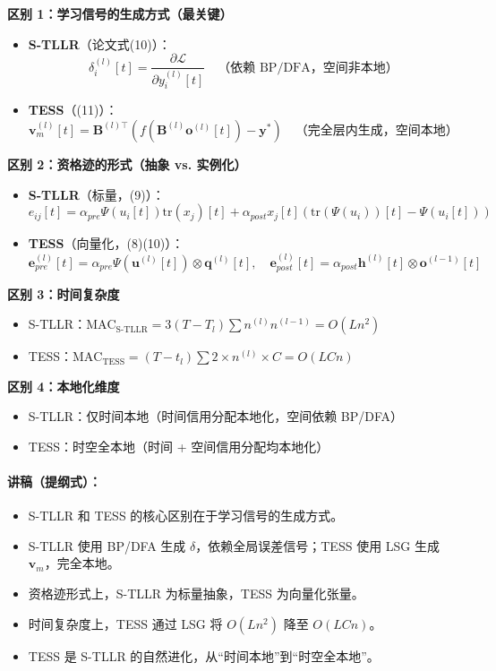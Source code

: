 \documentclass[journal,12pt,onecolumn]{IEEEtran}
\begin{document}
\textbf{区别 1：学习信号的生成方式（最关键）}
\begin{itemize}
    \item \textbf{S-TLLR}（论文式(10)）：
    \[
    \delta_i^{(l)}[t] = \frac{\partial \mathcal{L}}{\partial y_i^{(l)}[t]} \quad \text{（依赖 BP/DFA，空间非本地）}
    \]
    \item \textbf{TESS}（\cite{apolinario_tess_2025}(11)）：
    \[
    \mathbf{v}_m^{(l)}[t] = \mathbf{B}^{(l)\top} \left( f(\mathbf{B}^{(l)} \mathbf{o}^{(l)}[t]) - \mathbf{y}^* \right) \quad \text{（完全层内生成，空间本地）}
    \]
\end{itemize}

\textbf{区别 2：资格迹的形式（抽象 vs. 实例化）}
\begin{itemize}
    \item \textbf{S-TLLR}（标量，\cite{apolinario_s-tllr_2024}(9)）：
    \[
    e_{ij}[t] = \alpha_{pre}\Psi(u_i[t])\text{tr}(x_j)[t] + \alpha_{post}x_j[t](\text{tr}(\Psi(u_i))[t] - \Psi(u_i[t]))
    \]
    \item \textbf{TESS}（向量化，\cite{apolinario_tess_2025}(8)(10)）：
    \[
    \mathbf{e}_{pre}^{(l)}[t] = \alpha_{pre}\Psi(\mathbf{u}^{(l)}[t]) \otimes \mathbf{q}^{(l)}[t], \quad
    \mathbf{e}_{post}^{(l)}[t] = \alpha_{post}\mathbf{h}^{(l)}[t] \otimes \mathbf{o}^{(l-1)}[t]
    \]
\end{itemize}

\textbf{区别 3：时间复杂度}
\begin{itemize}
    \item S-TLLR：\(\text{MAC}_{\text{S-TLLR}} = 3(T-T_l) \sum n^{(l)} n^{(l-1)} = O(Ln^2)\)
    \item TESS：\(\text{MAC}_{\text{TESS}} = (T-t_l) \sum 2 \times n^{(l)} \times C = O(LCn)\)
\end{itemize}

\textbf{区别 4：本地化维度}
\begin{itemize}
    \item S-TLLR：{\color{myred}仅时间本地}（时间信用分配本地化，空间依赖 BP/DFA）
    \item TESS：{\color{mygreen}时空全本地}（时间 + 空间信用分配均本地化）
\end{itemize}

\paragraph{\textbf{讲稿（提纲式）：}}
\begin{itemize}
    \item S-TLLR 和 TESS 的核心区别在于学习信号的生成方式。
    \item S-TLLR 使用 BP/DFA 生成 \(\delta\)，依赖全局误差信号；TESS 使用 LSG 生成 \(\mathbf{v}_m\)，完全本地。
    \item 资格迹形式上，S-TLLR 为标量抽象，TESS 为向量化张量。
    \item 时间复杂度上，TESS 通过 LSG 将 \(O(Ln^2)\) 降至 \(O(LCn)\)。
    \item TESS 是 S-TLLR 的自然进化，从“时间本地”到“时空全本地”。
\end{itemize}
\end{document}
